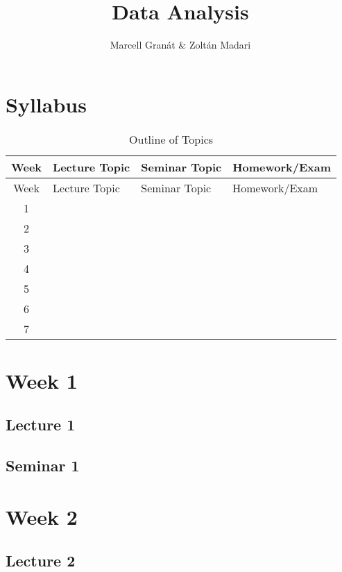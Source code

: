 \documentclass[
]{article}
\title{Data Analysis}
\author{Marcell Granát \& Zoltán Madari}
\date{}
\begin{document}
\maketitle

{
\setcounter{tocdepth}{2}
\tableofcontents
}
\hypertarget{index}{%
\section{Syllabus}\label{index}}

\begin{longtable}[]{@{}clll@{}}
\caption{Outline of Topics}\tabularnewline
\toprule
Week & Lecture Topic & Seminar Topic & Homework/Exam \\
\midrule
\endfirsthead
\toprule
Week & Lecture Topic & Seminar Topic & Homework/Exam \\
\midrule
\endhead
1 & & & \\
2 & & & \\
3 & & & \\
4 & & & \\
5 & & & \\
6 & & & \\
7 & & & \\
\bottomrule
\end{longtable}

\hypertarget{week-1}{%
\section{Week 1}\label{week-1}}

\hypertarget{lecture-1}{%
\subsection{Lecture 1}\label{lecture-1}}

\hypertarget{seminar-1}{%
\subsection{Seminar 1}\label{seminar-1}}

\hypertarget{Chapter-3}{%
\section{Week 2}\label{Chapter-3}}

\hypertarget{lecture-2}{%
\subsection{Lecture 2}\label{lecture-2}}
\end{document}
